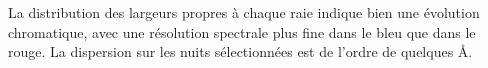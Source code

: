 \documentclass[../main/main.tex]{subfiles}
\begin{document}
La distribution des largeurs propres à chaque raie indique bien une
évolution chromatique, avec une résolution spectrale plus fine dans le
bleu que dans le rouge. La dispersion sur les nuits sélectionnées est de
l'ordre de quelques \AA.

\end{document}
